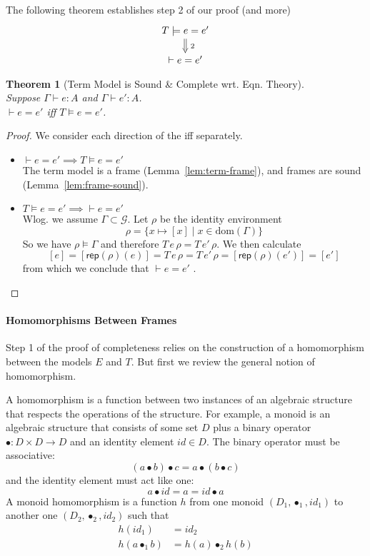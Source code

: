 \documentclass{tufte-handout}
\newtheorem{theorem}{Theorem}%
\begin{document}
The following theorem establishes step 2 of our proof (and more)
\[
\xymatrix@=15pt{
  T \models e = e' \ar@{=>}[d]^{\;2} \\
  \vdash e = e'
}
\]

\begin{theorem}[Term Model is Sound \& Complete wrt. Eqn. Theory]\ \\
  \label{thm:term-sound-complete}
  Suppose $\Gamma \vdash e : A$ and $\Gamma \vdash e' : A$.\\
  $\vdash e = e'$ iff $T \models e = e'$.
\end{theorem}
\begin{proof}
  We consider each direction of the iff separately.
  \begin{itemize}
  \item $\vdash e = e' \implies T \models e = e'$ \\
    The term model is a frame (Lemma~\ref{lem:term-frame}),
    and frames are sound (Lemma~\ref{lem:frame-sound}).
  \item $T \models e = e' \implies \vdash e = e'$ \\
    Wlog. we assume $\Gamma \subset \mathcal{G}$.
    Let $\rho$ be the identity environment
    \[
    \rho = \{ x \mapsto [x] \mid x \in \mathrm{dom}(\Gamma) \}
    \]
    So we have $\rho \models \Gamma$
    and therefore $T\,e\,\rho = T\,e'\,\rho$. We then calculate
    \[
      [e]
      = [\mathsf{rep}(\rho)(e)]
      = T\,e\,\rho
      = T\,e'\,\rho
      = [\mathsf{rep}(\rho)(e')]
      = [e']
    \]
    from which we conclude that $\vdash e = e'$ .
    
  \end{itemize}
  
\end{proof}




\paragraph{Homomorphisms Between Frames}

Step 1 of the proof of completeness relies on the construction of a
homomorphism between the models $E$ and $T$. But first we review the
general notion of homomorphism.

A homomorphism is a function between two instances of an algebraic
structure that respects the operations of the structure. For example,
a monoid is an algebraic structure that consists of some set $D$ plus
a binary operator $\bullet : D \times D \to D$ and an identity element
$\mathit{id} \in D$. The binary operator must be associative:
\[
(a \bullet b) \bullet c = a \bullet (b \bullet c)
\]
and the identity element must act like one:
\[
  a \bullet \mathit{id} = a = \mathit{id} \bullet a
\]
A monoid homomorphism is a function $h$ from one monoid
$(D_1,\bullet_1,\mathit{id}_1)$ to another one
$(D_2,\bullet_2,\mathit{id}_2)$ such that
\begin{align*}
  h(\mathit{id}_1) &= \mathit{id}_2 \\
  h(a \bullet_1 b) &= h(a) \bullet_2 h(b) 
\end{align*}
\end{document}
